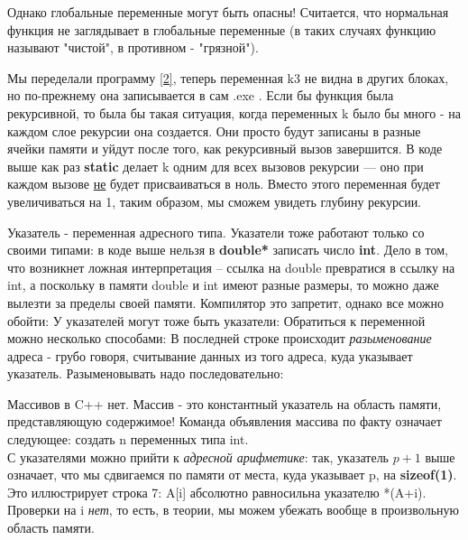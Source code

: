 \begin{lecture}[\lectureSubject]
\begin{lecSection}
		Однако глобальные переменные могут быть опасны! Считается, что нормальная функция не заглядывает в глобальные переменные (в таких случаях функцию называют "чистой", в противном - "грязной").
		\end{lecSection}
		\begin{lecSection}
		Мы переделали программу \ref{2}, теперь переменная k3 не видна в других блоках, но по-прежнему она записывается в сам .exe . Если бы функция была рекурсивной, то была бы такая ситуация, когда переменных k было бы много - на каждом слое рекурсии она создается. Они просто будут записаны в разные ячейки памяти и уйдут после того, как рекурсивный вызов завершится. 
		В коде выше как раз \textbf{static} делает k одним для всех вызовов рекурсии --- оно при каждом вызове \underline{не} будет присваиваться в ноль. Вместо этого переменная будет увеличиваться на 1, таким образом, мы сможем увидеть глубину рекурсии.
	\end{lecSection}
	\begin{lecSection}[Указатель]
		Указатель - переменная адресного типа.
		Указатели тоже работают только со своими типами: в коде выше нельзя в \textbf{double*} записать число \textbf{int}. Дело в том, что возникнет ложная интерпретация -- ссылка на double превратися в ссылку на int, а поскольку в памяти double и int имеют разные размеры, то можно даже вылезти за пределы своей памяти. Компилятор это запретит, однако все можно обойти:
		У указателей могут тоже быть указатели:
		Обратиться к переменной можно несколько способами:
		В последней строке происходит \textit{разыменование} адреса - грубо говоря, считывание данных из того адреса, куда указывает указатель. Разыменовывать надо последовательно:
	\end{lecSection}
	\begin{lecSection}
		Массивов в C++ нет. Массив - это константный указатель на область памяти, представляющую содержимое!
		Команда объявления массива по факту означает следующее: создать n переменных типа int. \\
		С указателями можно прийти к \textit{адресной арифметике}: так, указатель $p+1$ выше означает, что мы сдвигаемся по памяти от места, куда указывает p, на \textbf{sizeof(1)}. Это иллюстрирует строка 7: A[i] абсолютно равносильна указателю *(A+i). Проверки на i \textit{нет}, то есть, в теории, мы можем убежать вообще в произвольную область памяти.

\end{lecSection}
\end{lecture}
